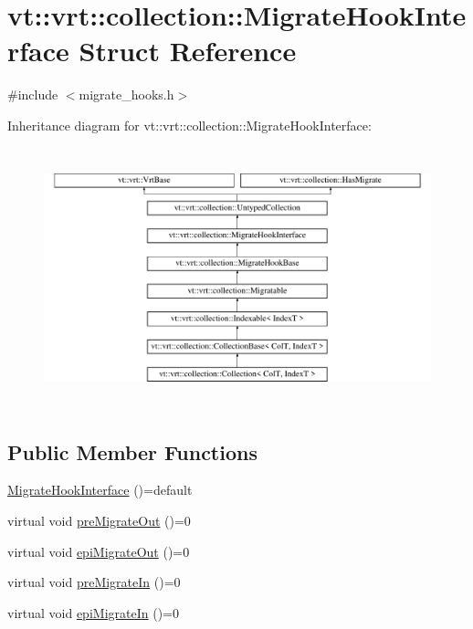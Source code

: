 \hypertarget{structvt_1_1vrt_1_1collection_1_1_migrate_hook_interface}{}\section{vt\+:\+:vrt\+:\+:collection\+:\+:Migrate\+Hook\+Interface Struct Reference}
\label{structvt_1_1vrt_1_1collection_1_1_migrate_hook_interface}


{\ttfamily \#include $<$migrate\+\_\+hooks.\+h$>$}

Inheritance diagram for vt\+:\+:vrt\+:\+:collection\+:\+:Migrate\+Hook\+Interface\+:\begin{figure}[H]
\begin{center}
\leavevmode
\includegraphics[height=7.542088cm]{structvt_1_1vrt_1_1collection_1_1_migrate_hook_interface}
\end{center}
\end{figure}
\subsection*{Public Member Functions}
\begin{DoxyCompactItemize}
\item 
\hyperlink{structvt_1_1vrt_1_1collection_1_1_migrate_hook_interface_a7fcec6d6a05c806ba91d418ee4dd6910}{Migrate\+Hook\+Interface} ()=default
\item 
virtual void \hyperlink{structvt_1_1vrt_1_1collection_1_1_migrate_hook_interface_a62bb547d9fb604428bc48bf324e3bc14}{pre\+Migrate\+Out} ()=0
\item 
virtual void \hyperlink{structvt_1_1vrt_1_1collection_1_1_migrate_hook_interface_ac1f0d90fec0c3b0f9df2f5379b53e15f}{epi\+Migrate\+Out} ()=0
\item 
virtual void \hyperlink{structvt_1_1vrt_1_1collection_1_1_migrate_hook_interface_a7bd07b1d69bc1cce87da2ce06231f382}{pre\+Migrate\+In} ()=0
\item 
virtual void \hyperlink{structvt_1_1vrt_1_1collection_1_1_migrate_hook_interface_ab62eb6ac33ae44f73d6b6e5977d0f81e}{epi\+Migrate\+In} ()=0
\end{DoxyCompactItemize}
